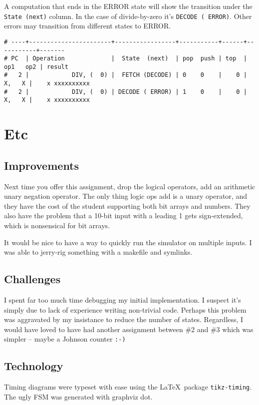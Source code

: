 \documentclass{article}
\begin{document}
A computation that ends in the ERROR state will show the transition under the \verb'State (next)' column.
In the case of divide-by-zero it's \verb'DECODE ( ERROR)'.
Other errors may transition from different states to ERROR.
\begin{verbatim}
# ----+-----------------------+-----------------+-----------+------+-----------+-------
# PC  | Operation             |  State  (next)  | pop  push | top  | op1   op2 | result
#   2 |            DIV, (  0) |  FETCH (DECODE) | 0    0    |    0 |    X,   X |    x xxxxxxxxxx
#   2 |            DIV, (  0) | DECODE ( ERROR) | 1    0    |    0 |    X,   X |    x xxxxxxxxxx
\end{verbatim}


\section{Etc}
\subsection{Improvements}
Next time you offer this assignment, drop the logical operators, add an arithmetic unary negation operator.
The only thing logic ops add is a unary operator, and they have the cost of the student supporting both bit arrays and numbers.
They also have the problem that a 10-bit input with a leading 1 gets sign-extended, which is nonsensical for bit arrays.

It would be nice to have a way to quickly run the simulator on multiple inputs.
I was able to jerry-rig something with a makefile and symlinks.
\subsection{Challenges}
I spent far too much time debugging my initial implementation.
I suspect it's simply due to lack of experience writing non-trivial code.
Perhaps this problem was aggravated by my insistance to reduce the number of states.
Regardless, I would have loved to have had another assignment between \#2 and \#3 which was simpler -- maybe a Johnson counter \verb':-)'

\subsection{Technology}
Timing diagrams were typeset with ease using the \LaTeX\ package \verb'tikz-timing'.
The ugly FSM was generated with graphviz dot.
\end{document}
